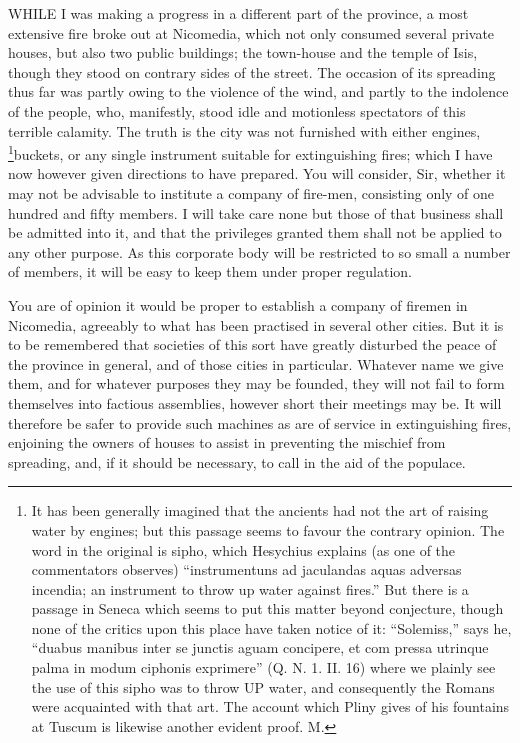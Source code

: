 
WHILE I was making a progress in a different part of the province, a most
extensive fire broke out at Nicomedia, which not only consumed several
private houses, but also two public buildings; the town-house and the
temple of Isis, though they stood on contrary sides of the street. The
occasion of its spreading thus far was partly owing to the violence of the
wind, and partly to the indolence of the people, who, manifestly, stood
idle and motionless spectators of this terrible calamity. The truth is the
city was not furnished with either engines, \footnote{It has been generally
imagined that the ancients had not the art of raising water by engines;
but this passage seems to favour the contrary opinion. The word in the
original is sipho, which Hesychius explains (as one of the commentators
observes) ``instrumentuns ad jaculandas aquas adversas incendia; an
instrument to throw up water against fires.'' But there is a passage in
Seneca which seems to put this matter beyond conjecture, though none of
the critics upon this place have taken notice of it: ``Solemiss,'' says he,
``duabus manibus inter se junctis aguam concipere, et com pressa utrinque
palma in modum ciphonis exprimere'' (Q. N. 1. II. 16) where we plainly see
the use of this sipho was to throw UP water, and consequently the Romans
were acquainted with that art. The account which Pliny gives of his
fountains at Tuscum is likewise another evident proof. M.}buckets, or any single
instrument suitable for extinguishing fires; which I have now however
given directions to have prepared. You will consider, Sir, whether it may
not be advisable to institute a company of fire-men, consisting only of
one hundred and fifty members. I will take care none but those of that
business shall be admitted into it, and that the privileges granted them
shall not be applied to any other purpose. As this corporate body will be
restricted to so small a number of members, it will be easy to keep them
under proper regulation.


You are of opinion it would be proper to establish a company of firemen in
Nicomedia, agreeably to what has been practised in several other cities.
But it is to be remembered that societies of this sort have greatly
disturbed the peace of the province in general, and of those cities in
particular. Whatever name we give them, and for whatever purposes they may
be founded, they will not fail to form themselves into factious
assemblies, however short their meetings may be. It will therefore be
safer to provide such machines as are of service in extinguishing fires,
enjoining the owners of houses to assist in preventing the mischief from
spreading, and, if it should be necessary, to call in the aid of the
populace.

